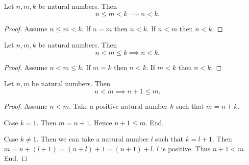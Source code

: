 \documentclass[../arithmetic.tex]{subfiles}
\begin{document}
  \begin{forthel}
    \begin{proposition}
      Let $n, m, k$ be natural numbers.
      Then \[ n \leq m \less k \implies n \less k. \]
    \end{proposition}
    \begin{proof}
      Assume $n \leq m \less k$.
      If $n = m$ then $n \less k$.
      If $n \less m$ then $n \less k$.
    \end{proof}
  \end{forthel}

  \begin{forthel}
    \begin{proposition}
      Let $n, m, k$ be natural numbers.
      Then \[ n \less m \leq k \implies n \less k. \]
    \end{proposition}
    \begin{proof}
      Assume $n \less m \leq k$.
      If $m = k$ then $n \less k$.
      If $m \less k$ then $n \less k$.
    \end{proof}
  \end{forthel}

  \begin{forthel}
    \begin{proposition}
      Let $n, m$ be natural numbers.
      Then \[ n \less m \implies n \plus 1 \leq m. \]
    \end{proposition}
    \begin{proof}
      Assume $n \less m$.
      Take a positive natural number $k$ such that $m = n \plus k$.

      Case $k = 1$.
        Then $m = n \plus 1$.
        Hence $n \plus 1 \leq m$.
      End.

      Case $k \neq 1$.
        Then we can take a natural number $l$ such that $k = l \plus 1$.
        Then $m
          = n \plus (l \plus 1)
          = (n \plus l) \plus 1
          = (n \plus 1) \plus l$.
        $l$ is positive.
        Thus $n \plus 1 \less m$.
      End.
    \end{proof}
  \end{forthel}
\end{document}
